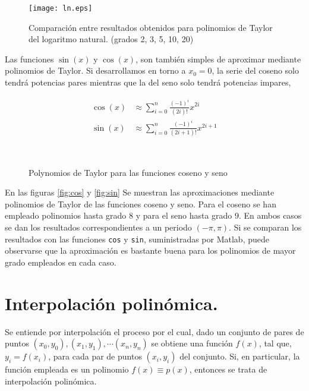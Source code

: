 \begin{figure}[h]
\centering
\texttt{[image: ln.eps]}
\caption{Comparación entre resultados obtenidos para polinomios de Taylor del logaritmo natural. (grados 2, 3, 5, 10, 20)}
\label{fig:ln}
\end{figure}

Las funciones $\sin(x)$ y $\cos(x)$, son también simples de aproximar mediante polinomios de Taylor. Si desarrollamos en torno a $x_0=0$, la serie del coseno solo tendrá potencias pares mientras que la del seno solo tendrá potencias impares,

\begin{align*}
\cos(x)&\approx \sum_{i=0}^n \frac{(-1)^i}{(2i)!}x^{2i}\\
\sin(x)&\approx \sum_{i=0}^n \frac{(-1)^i}{(2i+1)!}x^{2i+1}
\end{align*}

\begin{figure}[h]
\centering
{} \qquad 
{}\\
\caption{Polynomios de Taylor para las funciones coseno y seno  }
\end{figure}

En las figuras \ref{fig:cos} y \ref{fig:sin} Se muestran las aproximaciones mediante polinomios de Taylor de las funciones coseno y seno. Para el coseno se han empleado polinomios hasta grado 8 y para el seno hasta grado 9. En ambos casos se dan los resultados correspondientes a un periodo $(-\pi, \pi)$. Si se comparan los resultados con las funciones \texttt{cos} y \texttt{sin}, suministradas por Matlab, puede observarse que la aproximación es bastante buena para los polinomios de mayor grado empleados en cada caso.

\section{Interpolación polinómica.}

Se entiende por interpolación el proceso por el cual, dado un conjunto de pares de puntos $(x_0,y_0),(x_1,y_1),\cdots (x_n,y_n)$ se obtiene una función $f(x)$, tal que, $y_i=f(x_i)$, para cada par de puntos $(x_i,y_i)$ del conjunto. Si, en particular, la función empleada es un polinomio $f(x)\equiv p(x)$, entonces se trata de interpolación polinómica. 

